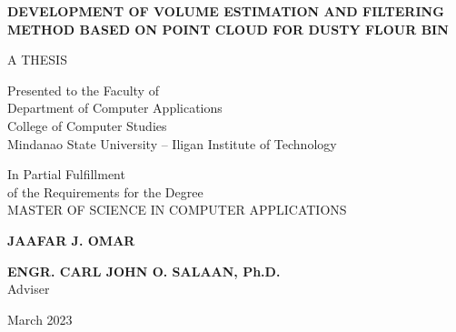 \documentclass[a4paper, 12pt]{report}
\begin{document}
\begin{titlepage}
	\setlength{\topmargin}{-40pt}
	\setlength{\textheight}{664pt}
	\begin{singlespace}
		\begin{center}
			\textbf{\MakeUppercase{Development of Volume Estimation and Filtering Method Based on Point Cloud for Dusty Flour Bin}}
			\vspace{3.0cm}

			\MakeUppercase{A THESIS}

			\vspace{2.0cm}

			Presented to the Faculty of\\
			Department of Computer Applications\\
			College of Computer Studies \\
			Mindanao State University -- Iligan Institute of Technology

			\vspace{2.0cm}


			In Partial Fulfillment\\
			of the Requirements for the Degree\\
			MASTER OF SCIENCE IN COMPUTER APPLICATIONS

			\vspace{2.25cm}

			\textbf{JAAFAR J. OMAR}

			\vspace{3.0cm}

			\textbf{ENGR. CARL JOHN O. SALAAN, Ph.D.} \\
			Adviser
			\vspace{2.0cm}

			March 2023

		\end{center}
	\end{singlespace}
\end{titlepage}

\tableofcontents
\listoffigures
\listoftables








\end{document}
